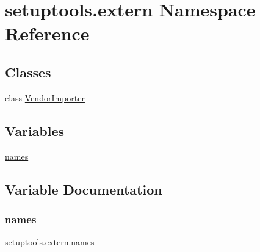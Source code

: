 \hypertarget{namespacesetuptools_1_1extern}{}\section{setuptools.\+extern Namespace Reference}
\label{namespacesetuptools_1_1extern}
\subsection*{Classes}
\begin{DoxyCompactItemize}
\item 
class \hyperlink{classsetuptools_1_1extern_1_1VendorImporter}{Vendor\+Importer}
\end{DoxyCompactItemize}
\subsection*{Variables}
\begin{DoxyCompactItemize}
\item 
\hyperlink{namespacesetuptools_1_1extern_abd24b5ae6a41d81c24ba1e0bc4404a5b}{names}
\end{DoxyCompactItemize}


\subsection{Variable Documentation}
\mbox{\label{namespacesetuptools_1_1extern_abd24b5ae6a41d81c24ba1e0bc4404a5b}} 
\subsubsection{\texorpdfstring{names}{names}}
{\footnotesize\ttfamily setuptools.\+extern.\+names}

